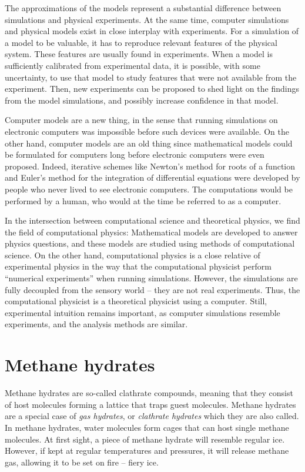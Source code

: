 The approximations of the models represent a substantial difference between simulations and physical experiments. At the same time, computer simulations and physical models exist in close interplay with experiments. For a simulation of a model to be valuable, it has to reproduce relevant features of the physical system. These features are usually found in experiments. When a model is sufficiently calibrated from experimental data, it is possible, with some uncertainty, to use that model to study features that were not available from the experiment. Then, new experiments can be proposed to shed light on the findings from the model simulations, and possibly increase confidence in that model.

Computer models are a new thing, in the sense that running simulations on electronic computers was impossible before such devices were available. On the other hand, computer models are an old thing since mathematical models could be formulated for computers long before electronic computers were even proposed. Indeed, iterative schemes like Newton's method for roots of a function and Euler's method for the integration of differential equations were developed by people who never lived to see electronic computers. The computations would be performed by a human, who would at the time be referred to as a computer. 

In the intersection between computational science and theoretical physics, we find the field of computational physics: Mathematical models are developed to answer physics questions, and these models are studied using methods of computational science. On the other hand, computational physics is a close relative of experimental physics in the way that the computational physicist perform ``numerical experiments'' when running simulations. However, the simulations are fully decoupled from the sensory world -- they are not real experiments. Thus, the computational physicist is a theoretical physicist using a computer. Still, experimental intuition remains important, as computer simulations resemble experiments, and the analysis methods are similar.

\section{Methane hydrates}
Methane hydrates are so-called clathrate compounds, meaning that they consist of host molecules forming a lattice that traps guest molecules. Methane hydrates are a special case of \emph{gas hydrates}, or \emph{clathrate hydrates} which they are also called. In methane hydrates, water molecules form cages that can host single methane molecules. At first sight, a piece of methane hydrate will resemble regular ice. However, if kept at regular temperatures and pressures, it will release methane gas, allowing it to be set on fire -- fiery ice. 

